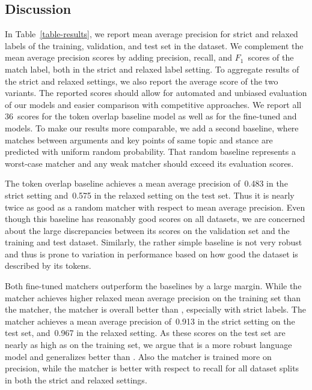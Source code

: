 \subsection{Discussion}
In Table~\ref{table-results}, we report mean average precision for strict and relaxed labels of the training, 
validation, and test set in the \ArgKP dataset.
We complement the mean average precision scores by adding precision, recall, and $F_1$~scores of the match label, 
both in the strict and relaxed label setting.
To aggregate results of the strict and relaxed settings, we also report the average score of the two variants.
The reported scores should allow for automated and unbiased evaluation of our models and easier comparison with competitive approaches.
We report all 36~scores for the token overlap baseline model as well as for the fine-tuned \BertBase and \RobertaBase models.
To make our results more comparable, we add a second baseline, where matches between arguments and key points of same 
topic and stance are predicted with uniform random probability.
That random baseline represents a worst-case matcher and any weak matcher should exceed its evaluation scores.

The token overlap baseline achieves a mean average precision of~0.483 in the strict setting and~0.575 in the relaxed 
setting on the test set.
Thus it is nearly twice as good as a random matcher with respect to mean average precision.
Even though this baseline has reasonably good scores on all datasets, we are concerned about the large discrepancies 
between its scores on the validation set and the training and test dataset.
Similarly, the rather simple baseline is not very robust and thus is prone to variation in performance based on how 
good the dataset is described by its tokens.

Both fine-tuned matchers outperform the baselines by a large margin.
While the \BertBase matcher achieves higher relaxed mean average precision on the training set than the \RobertaBase 
matcher, the \RobertaBase matcher is overall better than \Bert, especially with strict labels.
The \RobertaBase matcher achieves a mean average precision of~0.913 in the strict setting on the test set, and~0.967 
in the relaxed setting.
As these scores on the test set are nearly as high as on the training set, we argue that \Roberta is a more robust 
language model and generalizes better than \Bert.
Also the \RobertaBase matcher is trained more on precision, while the \BertBase matcher is better with respect to 
recall for all dataset splits in both the strict and relaxed settings.

